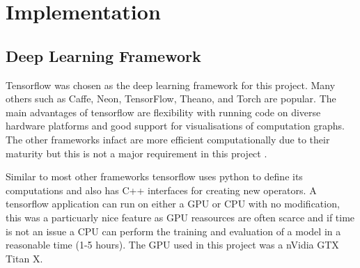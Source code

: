 \chapter{Implementation}
  \section{Deep Learning Framework}
    Tensorflow \cite{tensorflow} was chosen as the deep learning framework for this
    project. Many others such as Caffe, Neon, TensorFlow, Theano, and Torch are popular.
    The main advantages of tensorflow are flexibility with running code on diverse
    hardware platforms and good support for visualisations
    of computation graphs. The other frameworks infact are more efficient computationally due to their maturity
    but this is not a major requirement in this project \cite{Bahrampour2016}.


    Similar to most other frameworks tensorflow uses python
    to define its computations and also has C++ interfaces for creating new operators.
    A tensorflow application can run on either a GPU or CPU with no modification, this was
    a particuarly nice feature as GPU reasources are often scarce and if time is not an issue a CPU
    can perform the training and evaluation of a model in a reasonable time (1-5 hours). The GPU used in this project was a nVidia GTX Titan X.

